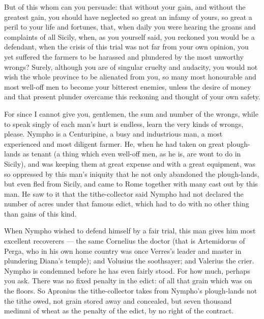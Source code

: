  But of this whom can you persuade: that without your gain, and without the greatest gain, you should have neglected so great an infamy of yours, so great a peril to your life and fortunes, that, when daily you were hearing the groans and complaints of all Sicily, when, as you yourself said, you reckoned you would be a defendant, when the crisis of this trial was not far from your own opinion, you yet suffered the farmers to be harassed and plundered by the most unworthy wrongs? Surely, although you are of singular cruelty and audacity, you would not wish the whole province to be alienated from you, so many most honourable and most well-off men to become your bitterest enemies, unless the desire of money and that present plunder overcame this reckoning and thought of your own safety.

 For since I cannot give you, gentlemen, the sum and number of the wrongs, while to speak singly of each man's hurt is endless, learn the very kinds of wrongs, please. Nympho is a Centuripine, a busy and industrious man, a most experienced and most diligent farmer. He, when he had taken on great plough-lands as tenant (a thing which even well-off men, as he is, are wont to do in Sicily), and was keeping them at great expense and with a great equipment, was so oppressed by this man's iniquity that he not only abandoned the plough-lands, but even fled from Sicily, and came to Rome together with many cast out by this man. He saw to it that the tithe-collector said Nympho had not declared the number of acres under that famous edict, which had to do with no other thing than gains of this kind.

 When Nympho wished to defend himself by a fair trial, this man gives him most excellent recoverers --- the same Cornelius the doctor (that is Artemidorus of Perga, who in his own home country was once Verres's leader and master in plundering Diana's temple); and Volusius the soothsayer; and Valerius the crier. Nympho is condemned before he has even fairly stood. For how much, perhaps you ask. There was no fixed penalty in the edict: of all that grain which was on the floors. So Apronius the tithe-collector takes from Nympho's plough-lands not the tithe owed, not grain stored away and concealed, but seven thousand medimni of wheat as the penalty of the edict, by no right of the contract.

